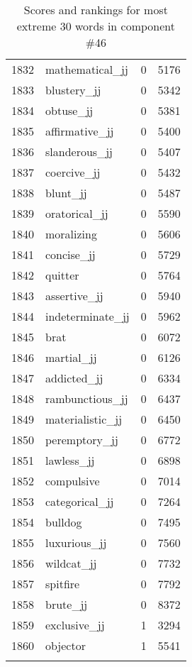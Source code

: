 \begin{longtable}[!htbp]{| rlr@{.}l |}
    1832 & mathematical\_jj & 0 & 5176 \\
    1833 & blustery\_jj & 0 & 5342 \\
    1834 & obtuse\_jj & 0 & 5381 \\
    1835 & affirmative\_jj & 0 & 5400 \\
    1836 & slanderous\_jj & 0 & 5407 \\
    1837 & coercive\_jj & 0 & 5432 \\
    1838 & blunt\_jj & 0 & 5487 \\
    1839 & oratorical\_jj & 0 & 5590 \\
    1840 & moralizing & 0 & 5606 \\
    1841 & concise\_jj & 0 & 5729 \\
    1842 & quitter & 0 & 5764 \\
    1843 & assertive\_jj & 0 & 5940 \\
    1844 & indeterminate\_jj & 0 & 5962 \\
    1845 & brat & 0 & 6072 \\
    1846 & martial\_jj & 0 & 6126 \\
    1847 & addicted\_jj & 0 & 6334 \\
    1848 & rambunctious\_jj & 0 & 6437 \\
    1849 & materialistic\_jj & 0 & 6450 \\
    1850 & peremptory\_jj & 0 & 6772 \\
    1851 & lawless\_jj & 0 & 6898 \\
    1852 & compulsive & 0 & 7014 \\
    1853 & categorical\_jj & 0 & 7264 \\
    1854 & bulldog & 0 & 7495 \\
    1855 & luxurious\_jj & 0 & 7560 \\
    1856 & wildcat\_jj & 0 & 7732 \\
    1857 & spitfire & 0 & 7792 \\
    1858 & brute\_jj & 0 & 8372 \\
    1859 & exclusive\_jj & 1 & 3294 \\
    1860 & objector & 1 & 5541 \\
    \hline
    \caption{Scores and rankings for most extreme 30 words in component \#46} \\
\end{longtable}
